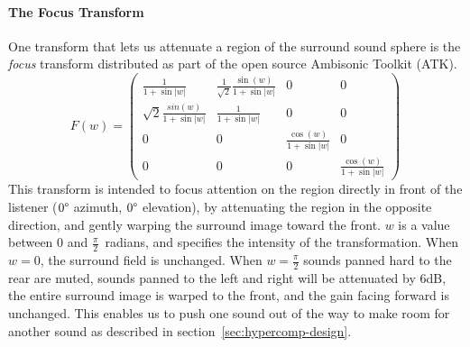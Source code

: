 \paragraph{The Focus Transform} One transform that lets us attenuate a
region of the surround sound sphere is the \textit{focus} transform
distributed as part of the open source Ambisonic Toolkit
(ATK).\cite{Anderson2009}
\begin{equation}
F(w)=\left( \begin{array}{cccc}
\frac{1}{1 + \sin|w|} & 
\frac{1}{\sqrt{2}} \frac{\sin(w)}{1 + \sin|w|}  & 
0 &
0 \\
\sqrt{2}\frac{sin(w)}{1 + \sin|w|} & %
\frac{1}{1 + \sin|w|} &                    %
0 & 
0 \\
0 & 
0 &
\frac{\cos(w)}{1 + \sin|w|} &
0 \\
0 &
0 &
0 &
\frac{\cos(w)}{1 + \sin|w|} 
\end{array} \right)
\label{eq:focus}
\end{equation}
This transform is intended to focus attention on the region directly
in front of the listener ($0\degree$ azimuth, $0\degree$ elevation),
by attenuating the region in the opposite direction, and gently
warping the surround image toward the front. $w$ is a value between
$0$ and $\frac{\pi}{2}$~radians, and specifies the intensity of the
transformation. When $w=0$, the surround field is unchanged. When
$w=\frac{\pi}{2}$ sounds panned hard to the rear are muted, sounds
panned to the left and right will be attenuated by 6dB, the entire
surround image is warped to the front, and the gain facing forward is
unchanged. This enables us to push one sound out of the way to make
room for another sound as described in
section~\ref{sec:hypercomp-design}.

